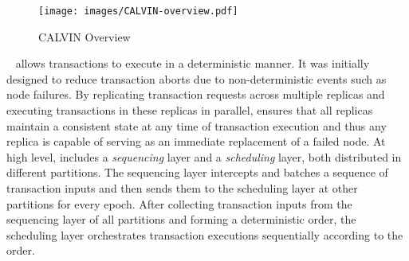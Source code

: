 \begin{comment}
\begin{figure}[htp]
    \centering
    \vspace{-0.2cm}
    \texttt{[image: images/CALVIN-det-framework.pdf]}
    \vspace{-0.4cm}
    \caption{Sequencing and Scheduling}
     \vspace{-0.3cm}
    \label{fig:calvin-det-framework}
\end{figure}

\begin{figure}[htp]
    \centering
    \vspace{-0.2cm}
    \texttt{[image: images/CALVIN.pdf]}
    \vspace{-0.4cm}
    \caption{Fetching, Execution and Commit}
    \vspace{-0.3cm}
    \label{fig:calvin-transaction}
\end{figure}
\end{comment}

\setlength{\intextsep}{2pt}%
\setlength{\columnsep}{8pt}%
\begin{wrapfigure}[7]{r}{.50\linewidth}
    \centering
    \vspace{-0.8cm}
    \texttt{[image: images/CALVIN-overview.pdf]}
    \vspace{-1cm}
    \caption{CALVIN Overview}
    \vspace{-0.4cm}
    \label{fig:calvin-overview}
\end{wrapfigure}
\calvin~\cite{Thomson:2012:CFD:2213836.2213838} allows transactions to execute in a deterministic manner. It was initially designed to reduce transaction aborts due to non-deterministic events such as node failures. By replicating transaction requests across multiple replicas and executing transactions in these replicas in parallel, \calvin ensures that all replicas maintain a consistent state at any time of transaction execution and thus any replica is capable of serving as an immediate replacement of a failed node. At high level, \calvin includes a {\em sequencing} layer and a {\em scheduling} layer, both distributed in different partitions. The sequencing layer intercepts and batches a sequence of transaction inputs and then sends them to the scheduling layer at other partitions for every epoch. After collecting transaction inputs from the sequencing layer of all partitions and forming a deterministic order, the scheduling layer orchestrates transaction executions sequentially according to the order.  



